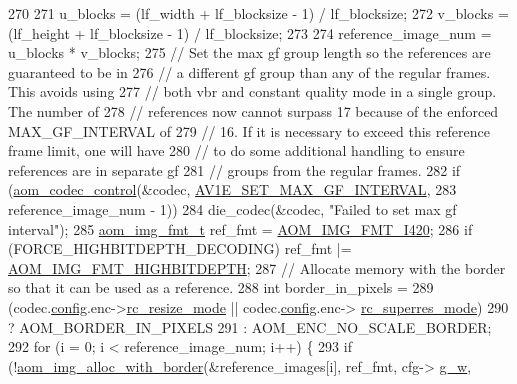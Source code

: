 \begin{DoxyCodeInclude}
{{{{{270 
271   u\_blocks = (lf\_width + lf\_blocksize - 1) / lf\_blocksize;
272   v\_blocks = (lf\_height + lf\_blocksize - 1) / lf\_blocksize;
273 
274   reference\_image\_num = u\_blocks * v\_blocks;
275   \textcolor{comment}{// Set the max gf group length so the references are guaranteed to be in}
276   \textcolor{comment}{// a different gf group than any of the regular frames. This avoids using}
277   \textcolor{comment}{// both vbr and constant quality mode in a single group. The number of}
278   \textcolor{comment}{// references now cannot surpass 17 because of the enforced MAX\_GF\_INTERVAL of}
279   \textcolor{comment}{// 16. If it is necessary to exceed this reference frame limit, one will have}
280   \textcolor{comment}{// to do some additional handling to ensure references are in separate gf}
281   \textcolor{comment}{// groups from the regular frames.}
282   \textcolor{keywordflow}{if} (\hyperlink{group__codec_ga6da974f4eeaba1fa74106b28d0fe6ac5}{aom\_codec\_control}(&codec, \hyperlink{group__aom__encoder_ggae78dde67a6d78f332e9bdba0dde42db5a0355cea227ab76f9bd77028a39bbfca8}{AV1E\_SET\_MAX\_GF\_INTERVAL},
283                         reference\_image\_num - 1))
284     die\_codec(&codec, \textcolor{stringliteral}{"Failed to set max gf interval"});
285   \hyperlink{aom__image_8h_ab71efff8c7f49380fad23b93bc2e9bfc}{aom\_img\_fmt\_t} ref\_fmt = \hyperlink{aom__image_8h_a930317c04b4bd0a660bb5e744055523cabd778a3d697463e89d12a1117f417b60}{AOM\_IMG\_FMT\_I420};
286   \textcolor{keywordflow}{if} (FORCE\_HIGHBITDEPTH\_DECODING) ref\_fmt |= \hyperlink{aom__image_8h_a607b37d91f75442f54223ecd85f1b6cb}{AOM\_IMG\_FMT\_HIGHBITDEPTH};
287   \textcolor{comment}{// Allocate memory with the border so that it can be used as a reference.}
288   \textcolor{keywordtype}{int} border\_in\_pixels =
289       (codec.\hyperlink{structaom__codec__ctx_ac6777025d3b72c9ab49adba78fc70b30}{config}.enc->\hyperlink{structaom__codec__enc__cfg_ab9123d944cd168511d65c823b30d5705}{rc\_resize\_mode} || codec.\hyperlink{structaom__codec__ctx_ac6777025d3b72c9ab49adba78fc70b30}{config}.enc->
      \hyperlink{structaom__codec__enc__cfg_a704ff1b4202b1d5499928b98eef17424}{rc\_superres\_mode})
290           ? AOM\_BORDER\_IN\_PIXELS
291           : AOM\_ENC\_NO\_SCALE\_BORDER;
292   \textcolor{keywordflow}{for} (i = 0; i < reference\_image\_num; i++) \{
293     \textcolor{keywordflow}{if} (!\hyperlink{aom__image_8h_aeb211e5184687f7e10d7c5bed4dcfdcd}{aom\_img\_alloc\_with\_border}(&reference\_images[i], ref\_fmt, cfg->
      \hyperlink{structaom__codec__enc__cfg_a80cb459c5ef3c7e1516f617c4c9d6eab}{g\_w},
}}}}}
\end{DoxyCodeInclude}
